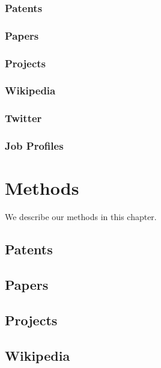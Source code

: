 \documentclass[]{book}
\begin{document}
\subsection{Patents}\label{patents}

\subsection{Papers}\label{papers}

\subsection{Projects}\label{projects}

\subsection{Wikipedia}\label{wikipedia}

\subsection{Twitter}\label{twitter}

\subsection{Job Profiles}\label{job-profiles}

\chapter{Methods}\label{methods}

We describe our methods in this chapter.

\section{Patents}\label{patents-1}

\section{Papers}\label{papers-1}

\section{Projects}\label{projects-1}

\section{Wikipedia}\label{wikipedia-1}
\end{document}
